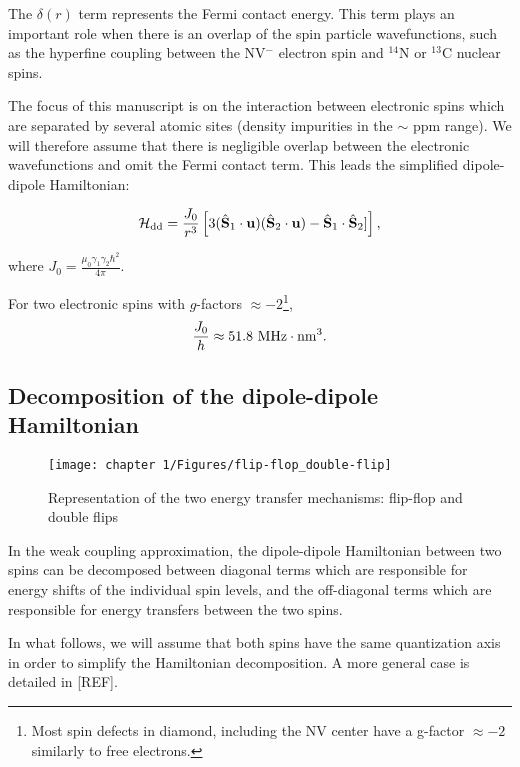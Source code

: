\documentclass[a4paper,11pt]{report}
\begin{document}
\begin{refsection}
The $\delta(r)$ term represents the Fermi contact energy. This term plays an important role when there is an overlap of the spin particle wavefunctions, such as the hyperfine coupling between the NV$^-$ electron spin and $^{14}$N \cite{doherty2012theory} or  $^{13}$C \cite{smeltzer201113c} nuclear spins.

The focus of this manuscript is on the interaction between electronic spins which are separated by several atomic sites (density impurities in the $\sim$ ppm range). We will therefore assume that there is negligible overlap between the electronic wavefunctions and omit the Fermi contact term. This leads the simplified dipole-dipole Hamiltonian:

\begin{equation}
\mathcal{H}_{\rm dd}= \frac{J_0}{r^3}\left[ 3 (\hat{\mathbf{S}}_1\cdot\mathbf{u})(\hat{\mathbf{S}}_2\cdot\mathbf{u}) - \hat{\mathbf{S}}_1\cdot\hat{\mathbf{S}}_2] \right],
\end{equation}

where $J_0=\frac{\mu_0 \gamma_1 \gamma_2 \hbar^2}{4 \pi}$.

For two electronic spins with $g$-factors $\approx -2$\footnote{Most spin defects in diamond, including the NV center have a g-factor $\approx -2$ similarly to free electrons.}, 
\begin{equation*}
\frac{J_0}{h} \approx 51.8\ \rm{MHz}\cdot \rm{nm}^3.
\end{equation*}

\subsection{Decomposition of the dipole-dipole Hamiltonian}

\begin{figure}[h!]
\centering
\texttt{[image: chapter 1/Figures/flip-flop\_double-flip]}
\caption{Representation of the two energy transfer mechanisms: flip-flop and double flips} 
\label{flip flop double flip}
\end{figure}

In the weak coupling approximation, the dipole-dipole Hamiltonian between two spins can be decomposed between diagonal terms which are responsible for energy shifts of the individual spin levels, and the off-diagonal terms which are responsible for energy transfers between the two spins.

In what follows, we will assume that both spins have the same quantization axis in order to simplify the Hamiltonian decomposition. A more general case is detailed in [REF].


\end{refsection}
\end{document}
